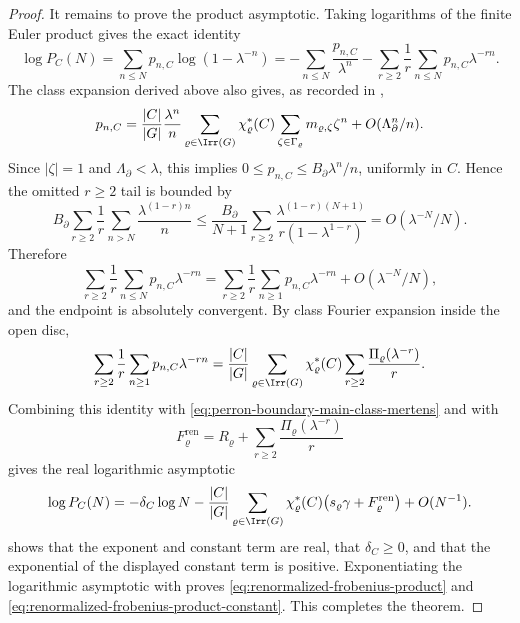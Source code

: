 \begin{proof}
  It remains to prove the product asymptotic.  Taking logarithms of the
  finite Euler product gives the exact identity
  \[
    \log P_C(N)
    =
    \sum_{n\le N}p_{n,C}\log(1-\lambda^{-n})
    =
    -\sum_{n\le N}\frac{p_{n,C}}{\lambda^n}
    -\sum_{r\ge2}\frac1r\sum_{n\le N}p_{n,C}\lambda^{-rn}.
  \]
  The class expansion derived above also gives, as recorded in
  ,
  \[
    p_{n,C}
    =
    \frac{|C|}{|G|}\frac{\lambda^n}{n}
      \sum_{\varrho\in\Irr(G)}
        \chi_\varrho^\ast(C)
        \sum_{\zeta\in\Gamma_\varrho}
          m_{\varrho,\zeta}\zeta^n
    +O(\Lambda_\partial^n/n).
  \]
  Since \(|\zeta|=1\) and \(\Lambda_\partial<\lambda\), this implies
  \(0\le p_{n,C}\le B_\partial\lambda^n/n\), uniformly in \(C\).  Hence
  the omitted \(r\ge2\) tail is bounded by
  \[
    B_\partial
    \sum_{r\ge2}\frac1r\sum_{n>N}\frac{\lambda^{(1-r)n}}n
    \le
    \frac{B_\partial}{N+1}
    \sum_{r\ge2}
      \frac{\lambda^{(1-r)(N+1)}}{r(1-\lambda^{1-r})}
    =
    O(\lambda^{-N}/N).
  \]
  Therefore
  \[
    \sum_{r\ge2}\frac1r\sum_{n\le N}p_{n,C}\lambda^{-rn}
    =
    \sum_{r\ge2}\frac1r\sum_{n\ge1}p_{n,C}\lambda^{-rn}
    +O(\lambda^{-N}/N),
  \]
  and the endpoint is absolutely convergent.  By class Fourier expansion
  inside the open disc,
  \[
    \sum_{r\ge2}\frac1r\sum_{n\ge1}p_{n,C}\lambda^{-rn}
    =
    \frac{|C|}{|G|}
      \sum_{\varrho\in\Irr(G)}
        \chi_\varrho^\ast(C)
        \sum_{r\ge2}\frac{\Pi_\varrho(\lambda^{-r})}{r}.
  \]
  Combining this identity with
  \eqref{eq:perron-boundary-main-class-mertens} and with
  \[
    F_\varrho^{\mathrm{ren}}
    =
    R_\varrho+\sum_{r\ge2}\frac{\Pi_\varrho(\lambda^{-r})}{r}
  \]
  gives the real logarithmic asymptotic
  \[
    \log P_C(N)
    =
    -\delta_C\log N
    -\frac{|C|}{|G|}
      \sum_{\varrho\in\Irr(G)}
        \chi_\varrho^\ast(C)
        \bigl(s_\varrho\gamma+F_\varrho^{\mathrm{ren}}\bigr)
    +O(N^{-1}).
  \]
   shows that the exponent and
  constant term are real, that \(\delta_C\ge0\), and that the exponential of
  the displayed constant term is positive.  Exponentiating the logarithmic
  asymptotic with  proves
  \eqref{eq:renormalized-frobenius-product} and
  \eqref{eq:renormalized-frobenius-product-constant}.  This completes the
  theorem.
\end{proof}

